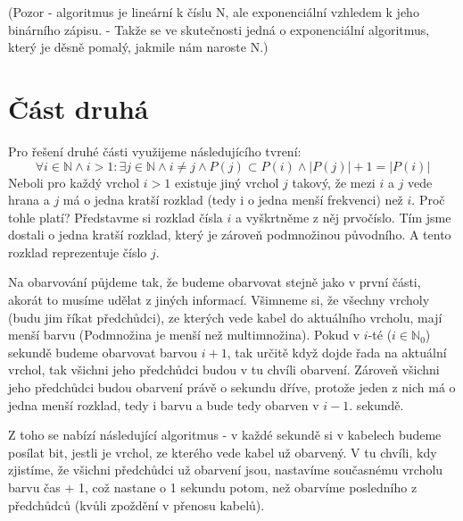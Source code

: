 \documentclass{article}
\begin{document}
(Pozor - algoritmus je lineární k číslu N, ale exponenciální vzhledem k jeho binárního zápisu. - Takže se ve skutečnosti jedná o exponenciální algoritmus,
který je děsně pomalý, jakmile nám naroste N.)
\section*{Část druhá}
Pro řešení druhé části využijeme následujícího tvrení:
\[\forall i \in \mathbb{N} \land i > 1: \exists j \in \mathbb{N} \land i \not = j \land P(j) \subset P(i) \land |P(j)| + 1 = |P(i)|\]
Neboli pro každý vrchol \(i > 1\) existuje jiný vrchol \(j\) takový, že mezi \(i\) a \(j\) vede hrana a \(j\) má o jedna kratší rozklad
(tedy i o jedna menší frekvenci) než \(i\). Proč tohle platí? Představme si rozklad čísla \(i\) a vyškrtněme z něj prvočíslo. Tím
jsme dostali o jedna kratší rozklad, který je zároveň podmnožinou původního. A tento rozklad reprezentuje číslo \(j\).

Na obarvování půjdeme tak, že budeme obarvovat stejně jako v první části, akorát to musíme udělat z jiných informací. Všimneme si, že všechny
vrcholy (budu jim říkat předchůdci), ze kterých vede kabel do aktuálního vrcholu, mají menší barvu (Podmnožina je menší než multimnožina).
Pokud v \(i\)-té (\(i \in \mathbb{N}_0\)) sekundě budeme obarvovat barvou \(i+1\), tak určitě když dojde řada na aktuální vrchol, tak všichni jeho předchůdci budou v tu
chvíli obarvení. Zároveň všichni jeho předchůdci budou obarvení právě o sekundu dříve, protože jeden z nich má o jedna menší rozklad, tedy i barvu
a bude tedy obarven v \(i-1\). sekundě.

Z toho se nabízí následující algoritmus - v každé sekundě si v kabelech budeme posílat bit, jestli je vrchol, ze kterého vede kabel už obarvený.
V tu chvíli, kdy zjistíme, že všichni předchůdci už obarvení jsou, nastavíme současnému vrcholu barvu čas + 1, což nastane o 1 sekundu potom, než obarvíme
posledního z předchůdců (kvůli zpoždění v přenosu kabelů).
\end{document}

